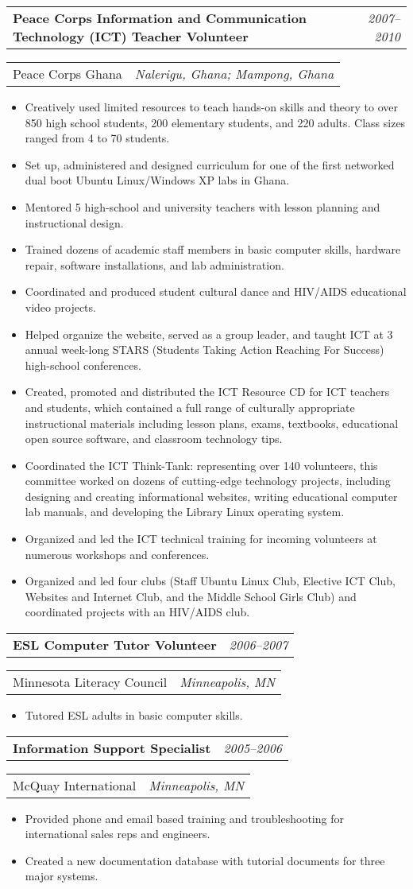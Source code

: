 \documentclass[letterpaper,11pt]{article}
\newcommand{\resitem}[1]{\item #1 \vspace{-8pt}}
\newcommand{\ressubheading}[4]{\vspace{4pt}
	\begin{tabularx}{\textwidth}{X r}
		\textbf{#1} & \textit{#4}
	\end{tabularx}

	\begin{tabularx}{\textwidth}{X r}
		#2 & \textit{#3}
	\end{tabularx}\vspace{-6pt}
	
}
\begin{document}
	\ressubheading{Peace Corps Information and Communication Technology (ICT) Teacher Volunteer}{Peace Corps Ghana}{Nalerigu, Ghana; Mampong, Ghana}{2007--2010}
	\begin{itemize}
		\resitem{Creatively used limited resources to teach hands-on skills and theory to over 850 high school students, 200 elementary students, and 220 adults. Class sizes ranged from 4 to 70 students.}
		\resitem{Set up, administered and designed curriculum for one of the first networked dual boot Ubuntu Linux/Windows XP labs in Ghana. }
		\resitem{Mentored 5 high-school and university teachers with lesson planning and instructional design. }
		\resitem{Trained dozens of academic staff members in basic computer skills, hardware repair, software installations, and lab administration.}
		\resitem{Coordinated and produced student cultural dance and HIV/AIDS educational video projects.}
		\resitem{Helped organize the website, served as a group leader, and taught ICT at 3 annual week-long STARS (Students Taking Action Reaching For Success) high-school conferences.}
		\resitem{Created, promoted and distributed the ICT Resource CD for ICT teachers and students, which contained a full range of culturally appropriate instructional materials including lesson plans, exams, textbooks, educational open source software, and classroom technology tips.}
		\resitem{Coordinated the ICT Think-Tank: representing over 140 volunteers, this committee worked on dozens of cutting-edge technology projects, including designing and creating informational websites, writing educational computer lab manuals, and developing the Library Linux operating system. }
		\resitem{Organized and led the ICT technical training for incoming volunteers at numerous workshops and conferences.}
		\resitem{Organized and led four clubs (Staff Ubuntu Linux Club, Elective ICT Club, Websites and Internet Club, and the Middle School Girls Club) and coordinated projects with an HIV/AIDS club. }
	\end{itemize}

	\ressubheading{ESL Computer Tutor Volunteer}{Minnesota Literacy Council}{Minneapolis, MN}{2006--2007}
	\begin{itemize}
		\resitem{Tutored ESL adults in basic computer skills.}
	\end{itemize}

	\ressubheading{Information Support Specialist}{McQuay International}{Minneapolis, MN}{2005--2006}
	\begin{itemize}
		\resitem{Provided phone and email based training and troubleshooting for international sales reps and engineers.}
		\resitem{Created a new documentation database with tutorial documents for three major systems.}
	\end{itemize}
\end{document}
